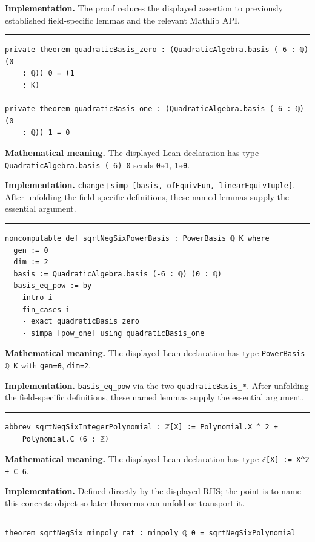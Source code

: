 \documentclass[UTF8,a4paper,11pt,fontset=fandol]{ctexart}
\theoremstyle{definition}
\newcommand{\statementsep}{\par\medskip\hrule\medskip}
\begin{document}
\noindent\textbf{Implementation.} The proof reduces the displayed assertion to previously established field-specific lemmas and the relevant Mathlib API.\par
\statementsep
\begin{verbatim}
private theorem quadraticBasis_zero : (QuadraticAlgebra.basis (-6 : ℚ) (0
    : ℚ)) 0 = (1
    : K)

private theorem quadraticBasis_one : (QuadraticAlgebra.basis (-6 : ℚ) (0
    : ℚ)) 1 = θ
\end{verbatim}
\noindent\textbf{Mathematical meaning.} The displayed Lean declaration has type \texttt{QuadraticAlgebra.\allowbreak{}basis (-6) 0} sends \texttt{0↦1}, \texttt{1↦θ}.\par
\noindent\textbf{Implementation.} \texttt{change}+\texttt{simp [basis, ofEquivFun, linearEquivTuple]}. After unfolding the field-specific definitions, these named lemmas supply the essential argument.\par
\statementsep
\begin{verbatim}
noncomputable def sqrtNegSixPowerBasis : PowerBasis ℚ K where
  gen := θ
  dim := 2
  basis := QuadraticAlgebra.basis (-6 : ℚ) (0 : ℚ)
  basis_eq_pow := by
    intro i
    fin_cases i
    · exact quadraticBasis_zero
    · simpa [pow_one] using quadraticBasis_one
\end{verbatim}
\noindent\textbf{Mathematical meaning.} The displayed Lean declaration has type \texttt{PowerBasis ℚ K} with \texttt{gen=θ}, \texttt{dim=2}.\par
\noindent\textbf{Implementation.} \texttt{basis\_\allowbreak{}eq\_\allowbreak{}pow} via the two \texttt{quadraticBasis\_\allowbreak{}*}. After unfolding the field-specific definitions, these named lemmas supply the essential argument.\par
\statementsep
\begin{verbatim}
abbrev sqrtNegSixIntegerPolynomial : ℤ[X] := Polynomial.X ^ 2 +
    Polynomial.C (6 : ℤ)
\end{verbatim}
\noindent\textbf{Mathematical meaning.} The displayed Lean declaration has type \texttt{ℤ[X] := X\textasciicircum{}2 + C 6}.\par
\noindent\textbf{Implementation.} Defined directly by the displayed RHS; the point is to name this concrete object so later theorems can unfold or transport it.\par
\statementsep
\begin{verbatim}
theorem sqrtNegSix_minpoly_rat : minpoly ℚ θ = sqrtNegSixPolynomial
\end{verbatim}
\end{document}
